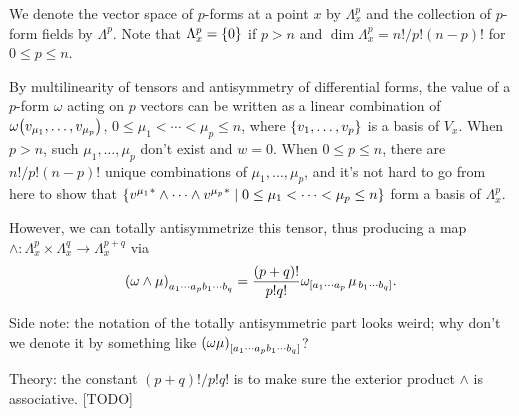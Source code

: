 \documentclass{note}
\numberwithin{equation}{chapter}
\begin{document}

\begin{quotebar}
    We denote the vector space of $p$-forms at a point $x$ by $\Lambda_x^p$ and the
    collection of $p$-form fields by $\Lambda^p$. Note that $\Lambda_x^p = \set{0}$
    if $p > n$ and $\dim \Lambda_x^p = n!/p!(n-p)!$ for $0 \leq p \leq n$.
\end{quotebar}

By multilinearity of tensors and antisymmetry of differential forms, the value
of a $p$-form $\omega$ acting on $p$ vectors can be written as a linear
combination of $\omega\prn{v_{\mu_1},\dots,v_{\mu_p}}$, $0 \leq \mu_1 < \cdots
    < \mu_p \leq n$, where $\set{v_1,\dots,v_p}$ is a basis of $V_x$. When $p > n$,
such $\mu_1, \dots, \mu_p$ don't exist and $w = 0$. When $0 \leq p \leq n$,
there are $n!/p!(n-p)!$ unique combinations of $\mu_1, \dots, \mu_p$, and it's
not hard to go from here to show that $\setbuilder{{v^{\mu_1}}^* \wedge \cdots
        \wedge {v^{\mu_p}}^*}{0 \leq \mu_1 < \cdots < \mu_p \leq n}$ form a basis of
$\Lambda_x^p$.

\begin{quotebar}
    However, we can totally antisymmetrize this tensor, thus producing a map
    $\wedge\colon \Lambda_x^p\times\Lambda_x^q \to \Lambda_x^{p+q}$ via
    \begin{equation*}
        \prn{\omega\wedge\mu}_{a_1\cdots a_pb_1\cdots b_q} = \frac{(p+q)!}{p!q!}
        \omega_{\left[a_1\cdots a_p\right.}\mu_{\left.b_1\cdots b_q\right]}.
    \end{equation*}
\end{quotebar}

Side note: the notation of the totally antisymmetric part looks weird; why
don't we denote it by something like $\prn{\omega\mu}_{\left[a_1\cdots a_p
        b_1\cdots b_q\right]}$?

Theory: the constant $(p+q)!/p!q!$ is to make sure the exterior product
$\wedge$ is associative. [TODO]




\end{document}
